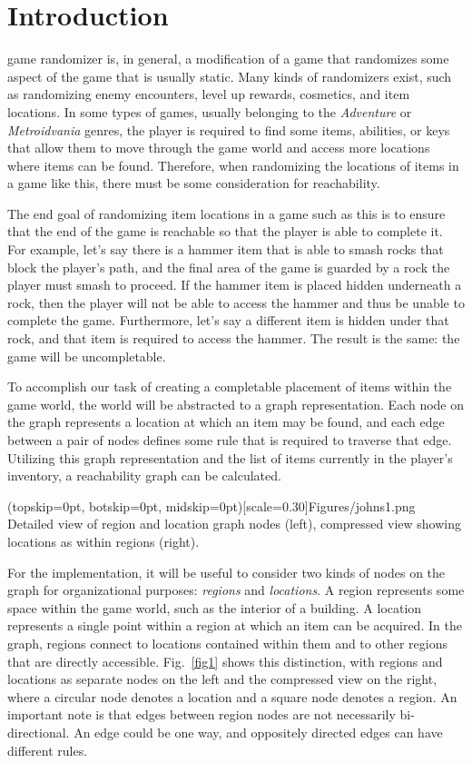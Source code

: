 \documentclass{ieeeaccess}
\begin{document}
\section{Introduction}
\label{sec:introduction}
game randomizer is, in general, a modification of a game that randomizes some
aspect of the game that is usually static. Many kinds of randomizers exist, such as randomizing
enemy encounters, level up rewards, cosmetics, and item locations. In some types of games,
usually belonging to the \textit{Adventure} or \textit{Metroidvania} genres, the player is
required to find some items, abilities, or keys that allow them to move through the game world
and access more locations where items can be found. Therefore, when randomizing the locations of
items in a game like this, there must be some consideration for reachability.

The end goal of randomizing item locations in a game such as this is to ensure that the end of
the game is reachable so that the player is able to complete it. For example, let’s say there is
a hammer item that is able to smash rocks that block the player’s path, and the final area of
the game is guarded by a rock the player must smash to proceed. If the hammer item is placed
hidden underneath a rock, then the player will not be able to access the hammer and thus be
unable to complete the game. Furthermore, let’s say a different item is hidden under that rock,
and that item is required to access the hammer. The result is the same: the game will be
uncompletable.

To accomplish our task of creating a completable placement of items within the game world, the
world will be abstracted to a graph representation. Each node on the graph represents a location
at which an item may be found, and each edge between a pair of nodes defines some rule that is
required to traverse that edge. Utilizing this graph representation and the list of items
currently in the player’s inventory, a reachability graph can be calculated.

\Figure[t!](topskip=0pt, botskip=0pt, midskip=0pt)[scale=0.30]{Figures/johns1.png}
{Detailed view of region and location graph nodes (left), compressed view showing locations as
within regions (right).\label{fig1}}

For the implementation, it will be useful to consider two kinds of nodes on the graph for
organizational purposes: {\it regions} and {\it locations}. A region represents some space
within the game world, such as the interior of a building. A location represents a single point
within a region at which an item can be acquired. In the graph, regions connect to locations
contained within them and to other regions that are directly accessible. Fig.~\ref{fig1} shows
this distinction, with regions and locations as separate nodes on the left and the compressed
view on the right, where a circular node denotes a location and a square node denotes a region.
An important note is that edges between region nodes are not necessarily bi-directional. An edge
could be one way, and oppositely directed edges can have different rules.
\end{document}
